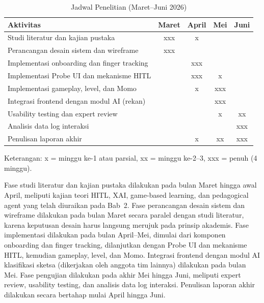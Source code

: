 \begin{table}[H]
\centering
\caption{Jadwal Penelitian (Maret--Juni 2026)}
\label{tab:jadwal-penelitian}
\begin{tabular}{|l|c|c|c|c|}
\hline
\textbf{Aktivitas} & \textbf{Maret} & \textbf{April} & \textbf{Mei} & \textbf{Juni} \\ \hline
Studi literatur dan kajian pustaka & xxx & x & & \\ \hline
Perancangan desain sistem dan wireframe & xxx & & & \\ \hline
Implementasi onboarding dan finger tracking & & xxx & & \\ \hline
Implementasi Probe UI dan mekanisme HITL & & xxx & x & \\ \hline
Implementasi gameplay, level, dan Momo & & x & xxx & \\ \hline
Integrasi frontend dengan modul AI (rekan) & & & xxx & \\ \hline
Usability testing dan expert review & & & x & xx \\ \hline
Analisis data log interaksi & & & & xxx \\ \hline
Penulisan laporan akhir & & x & xx & xxx \\ \hline
\end{tabular}
\end{table}

Keterangan: x = minggu ke-1 atau parsial, xx = minggu ke-2--3, xxx = penuh (4 minggu).

Fase studi literatur dan kajian pustaka dilakukan pada bulan Maret hingga awal April, meliputi kajian teori HITL, XAI, game-based learning, dan pedagogical agent yang telah diuraikan pada Bab~2. Fase perancangan desain sistem dan wireframe dilakukan pada bulan Maret secara paralel dengan studi literatur, karena keputusan desain harus langsung merujuk pada prinsip akademis. Fase implementasi dilakukan pada bulan April--Mei, dimulai dari komponen onboarding dan finger tracking, dilanjutkan dengan Probe UI dan mekanisme HITL, kemudian gameplay, level, dan Momo. Integrasi frontend dengan modul AI klasifikasi sketsa (dikerjakan oleh anggota tim lainnya) dilakukan pada bulan Mei. Fase pengujian dilakukan pada akhir Mei hingga Juni, meliputi expert review, usability testing, dan analisis data log interaksi. Penulisan laporan akhir dilakukan secara bertahap mulai April hingga Juni.
